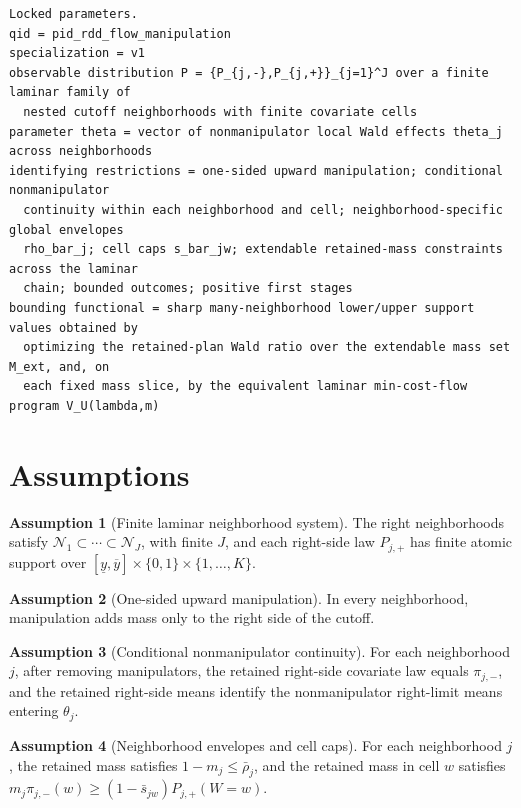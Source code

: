 \documentclass[11pt]{article}
\theoremstyle{definition}
\newtheorem{assumption}{Assumption}
\theoremstyle{plain}
\theoremstyle{remark}
\begin{document}
\begin{verbatim}
Locked parameters.
qid = pid_rdd_flow_manipulation
specialization = v1
observable distribution P = {P_{j,-},P_{j,+}}_{j=1}^J over a finite laminar family of
  nested cutoff neighborhoods with finite covariate cells
parameter theta = vector of nonmanipulator local Wald effects theta_j across neighborhoods
identifying restrictions = one-sided upward manipulation; conditional nonmanipulator
  continuity within each neighborhood and cell; neighborhood-specific global envelopes
  rho_bar_j; cell caps s_bar_jw; extendable retained-mass constraints across the laminar
  chain; bounded outcomes; positive first stages
bounding functional = sharp many-neighborhood lower/upper support values obtained by
  optimizing the retained-plan Wald ratio over the extendable mass set M_ext, and, on
  each fixed mass slice, by the equivalent laminar min-cost-flow program V_U(lambda,m)
\end{verbatim}

\section{Assumptions}
\begin{assumption}[Finite laminar neighborhood system]\label{ass:laminar}
The right neighborhoods satisfy
\(\mathcal N_1\subset\cdots\subset\mathcal N_J\), with finite \(J\), and each right-side
law \(P_{j,+}\) has finite atomic support over
\([\underline y,\overline y]\times\{0,1\}\times\{1,\ldots,K\}\).
\end{assumption}

\begin{assumption}[One-sided upward manipulation]\label{ass:one-sided}
In every neighborhood, manipulation adds mass only to the right side of the cutoff.
\end{assumption}

\begin{assumption}[Conditional nonmanipulator continuity]\label{ass:continuity}
For each neighborhood \(j\), after removing manipulators, the retained right-side
covariate law equals \(\pi_{j,-}\), and the retained right-side means identify the
nonmanipulator right-limit means entering \(\theta_j\).
\end{assumption}

\begin{assumption}[Neighborhood envelopes and cell caps]\label{ass:budgets}
For each neighborhood \(j\), the retained mass satisfies \(1-m_j\le\bar\rho_j\), and the
retained mass in cell \(w\) satisfies
\(m_j\pi_{j,-}(w)\ge(1-\bar s_{jw})P_{j,+}(W=w)\).
\end{assumption}
\end{document}
